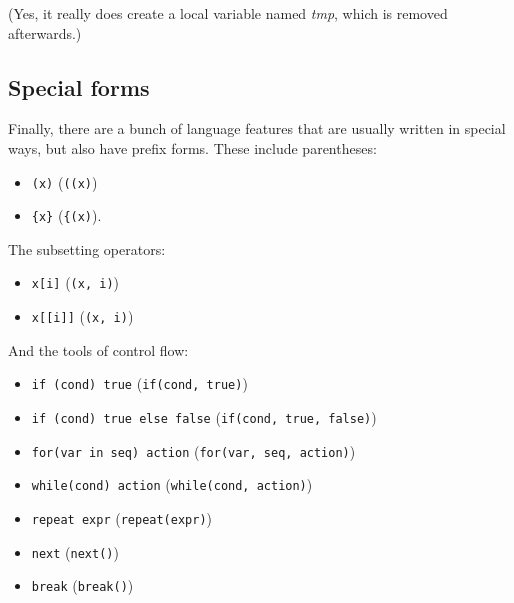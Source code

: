 \documentclass[]{book}
\providecommand{\tightlist}{%
  \setlength{\itemsep}{0pt}\setlength{\parskip}{0pt}}
\theoremstyle{definition}
\theoremstyle{definition}
\theoremstyle{definition}
\theoremstyle{remark}
\begin{document}
(Yes, it really does create a local variable named \emph{tmp}, which is
removed afterwards.)

\hypertarget{special-forms}{%
\subsection{Special forms}\label{special-forms}}

Finally, there are a bunch of language features that are usually written
in special ways, but also have prefix forms. These include parentheses:

\begin{itemize}
\tightlist
\item
  \texttt{(x)} (\texttt{\textasciigrave{}(\textasciigrave{}(x)})
\item
  \texttt{\{x\}} (\texttt{\textasciigrave{}\{\textasciigrave{}(x)}).
\end{itemize}

The subsetting operators:

\begin{itemize}
\tightlist
\item
  \texttt{x{[}i{]}}
  (\texttt{\textasciigrave{}{[}\textasciigrave{}(x,\ i)})
\item
  \texttt{x{[}{[}i{]}{]}}
  (\texttt{\textasciigrave{}{[}{[}\textasciigrave{}(x,\ i)})
\end{itemize}

And the tools of control flow:

\begin{itemize}
\tightlist
\item
  \texttt{if\ (cond)\ true}
  (\texttt{\textasciigrave{}if\textasciigrave{}(cond,\ true)})
\item
  \texttt{if\ (cond)\ true\ else\ false}
  (\texttt{\textasciigrave{}if\textasciigrave{}(cond,\ true,\ false)})
\item
  \texttt{for(var\ in\ seq)\ action}
  (\texttt{\textasciigrave{}for\textasciigrave{}(var,\ seq,\ action)})
\item
  \texttt{while(cond)\ action}
  (\texttt{\textasciigrave{}while\textasciigrave{}(cond,\ action)})
\item
  \texttt{repeat\ expr}
  (\texttt{\textasciigrave{}repeat\textasciigrave{}(expr)})
\item
  \texttt{next} (\texttt{\textasciigrave{}next\textasciigrave{}()})
\item
  \texttt{break} (\texttt{\textasciigrave{}break\textasciigrave{}()})
\end{itemize}
\end{document}
